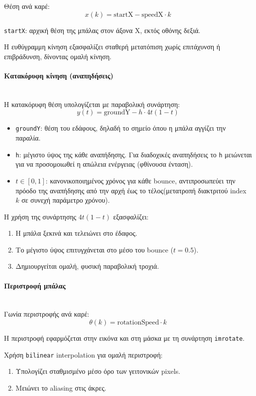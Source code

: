 \documentclass[12pt]{article}
\begin{document}
Θέση ανά καρέ:
\[
x(k) = \text{startX} - \text{speedX} \cdot k
\]

\texttt{startX}: αρχική θέση της μπάλας στον άξονα X, εκτός οθόνης δεξιά.

Η ευθύγραμμη κίνηση εξασφαλίζει σταθερή μετατόπιση χωρίς επιτάχυνση ή επιβράδυνση, δίνοντας ομαλή κίνηση.

\paragraph{Κατακόρυφη κίνηση (αναπηδήσεις)} 
\mbox{}\\
Η κατακόρυφη θέση υπολογίζεται με παραβολική συνάρτηση:
\[
y(t) = \text{groundY} - h \cdot 4 t (1-t)
\]

\begin{itemize}
  \item \texttt{groundY}: θέση του εδάφους, δηλαδή το σημείο όπου η μπάλα αγγίζει την παραλία.
  \item \texttt{h}: μέγιστο ύψος της κάθε αναπήδησης. Για διαδοχικές αναπηδήσεις το \texttt{h} μειώνεται για να προσομοιωθεί η απώλεια ενέργειας (φθίνουσα ένταση).
  \item \(t \in [0,1]\): κανονικοποιημένος χρόνος για κάθε bounce, αντιπροσωπεύει την πρόοδο της αναπήδησης από την αρχή έως το τέλος(μετατροπή διακτριτού index $k$ σε συνεχή παράμετρο χρόνου).
\end{itemize}  





Η χρήση της συνάρτησης \(4 t (1-t)\) εξασφαλίζει:
\begin{enumerate}
    \item Η μπάλα ξεκινά και τελειώνει στο έδαφος.
    \item Το μέγιστο ύψος επιτυγχάνεται στο μέσο του bounce (\(t=0.5\)).
    \item Δημιουργείται ομαλή, φυσική παραβολική τροχιά.
\end{enumerate}

\paragraph{Περιστροφή μπάλας} 
\mbox{}\\
Γωνία περιστροφής ανά καρέ:
\[
\theta(k) = \text{rotationSpeed} \cdot k
\]

Η περιστροφή εφαρμόζεται στην εικόνα και στη μάσκα με τη συνάρτηση \texttt{imrotate}.

Χρήση \texttt{bilinear} interpolation για ομαλή περιστροφή:
\begin{enumerate}
    \item Υπολογίζει σταθμισμένο μέσο όρο των γειτονικών pixels.
    \item Μειώνει το aliasing στις άκρες.
\end{enumerate}
\end{document}
